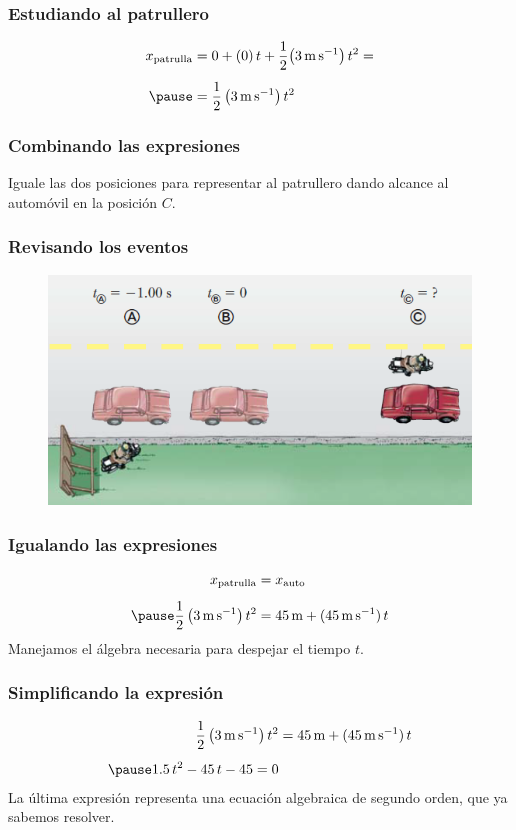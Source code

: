 \documentclass[14pt]{beamer}
\begin{document}
\begin{frame}
\frametitle{Estudiando al patrullero}
\begin{eqnarray*}
\begin{aligned}
x_{\text{patrulla}} &= 0 + (0) \, t + \dfrac{1}{2} \big( \SI{3}{\meter\per\second} \big) \, t^{2} = \\[0.5em] \pause
&= \dfrac{1}{2} \, \big( \SI{3}{\meter\per\second} \big) \, t^{2}
\end{aligned}
\end{eqnarray*}
\end{frame}
\begin{frame}
\frametitle{Combinando las expresiones}
Iguale las dos posiciones para representar al patrullero dando alcance al automóvil en la posición $C$.
\end{frame}
\begin{frame}
\frametitle{Revisando los eventos}
\begin{figure}
    \centering
    \includegraphics[scale=0.8]{Imagenes/Ejercicio_MUA_02_03.png}
\end{figure}
\end{frame}
\begin{frame}
\frametitle{Igualando las expresiones}
\begin{eqnarray*}
\begin{aligned}
x_{\text{patrulla}} &= x_{\text{auto}} \\[0.5em] \pause
\dfrac{1}{2} \, \big( \SI{3}{\meter\per\second} \big) \, t^{2} &= \SI{45}{\meter} + (\SI{45}{\meter\per\second}) \, t
\end{aligned}
\end{eqnarray*}
\pause
Manejamos el álgebra necesaria para despejar el tiempo $t$.
\end{frame}
\begin{frame}
\frametitle{Simplificando la expresión}
\begin{eqnarray*}
\begin{aligned}
\dfrac{1}{2} \, \big( \SI{3}{\meter\per\second} \big) \, t^{2} &= \SI{45}{\meter} + (\SI{45}{\meter\per\second}) \, t \\[0.5em] \pause
1.5 \, t^{2} - 45 \, t - 45 = 0
\end{aligned}
\end{eqnarray*}
\pause
La última expresión representa una ecuación algebraica de segundo orden, que ya sabemos resolver.
\end{frame}
\end{document}
